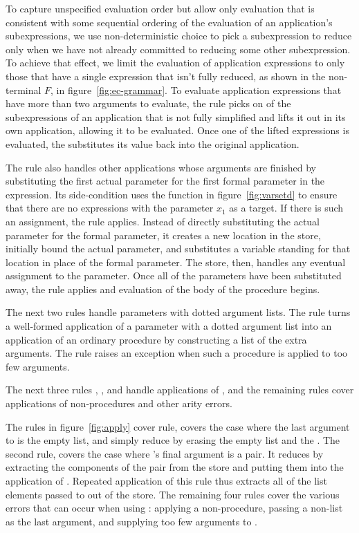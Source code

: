 To capture unspecified evaluation order but allow only evaluation that
is consistent with some sequential ordering of the evaluation of an
application's subexpressions, we use non-deterministic choice to pick
a subexpression to reduce only when we have not already committed to
reducing some other subexpression. To achieve that effect, we limit
the evaluation of application expressions to only those that have a
single expression that isn't fully reduced, as shown in the
non-terminal $F$, in figure~\ref{fig:ec-grammar}. To evaluate
application expressions that have more than two arguments to evaluate,
the rule  picks on of the subexpressions of an
application that is not fully simplified and lifts it out in its own
application, allowing it to be evaluated. Once one of the lifted
expressions is evaluated, the  substitutes its value
back into the original application.

The  rule also handles other applications whose
arguments are finished by substituting the first actual parameter for
the first formal parameter in the expression. Its side-condition uses
the function in figure~\ref{fig:varsetd} to ensure that there are no
 expressions with the parameter $x_1$ as a target.
If there is such an assignment, the  rule applies.
Instead of directly substituting the actual parameter for the formal
parameter, it creates a new location in the store, initially bound the
actual parameter, and substitutes a variable standing for that
location in place of the formal parameter. The store, then, handles
any eventual assignment to the parameter. Once all of the parameters
have been substituted away, the rule  applies and
evaluation of the body of the procedure begins.

The next two rules handle parameters with dotted argument lists. The
rule  turns a well-formed application of a
parameter with a dotted argument list into an application of an
ordinary procedure by constructing a list of the extra arguments. The
 rule raises an exception when such a procedure
is applied to too few arguments.

The next three rules , , and
 handle applications of , and the
remaining rules cover applications of non-procedures and other arity
errors.

The rules in figure~\ref{fig:apply} cover 
rule,  covers the case where the last argument to
 is the empty list, and simply reduce by erasing the
empty list and the . The second rule, 
covers the case where 's final argument is a pair. It
reduces by extracting the components of the pair from the store and
putting them into the application of . Repeated
application of this rule thus extracts all of the list elements passed
to  out of the store. The remaining four rules cover the
various errors that can occur when using : applying a
non-procedure, passing a non-list as the last argument, and supplying
too few arguments to .

